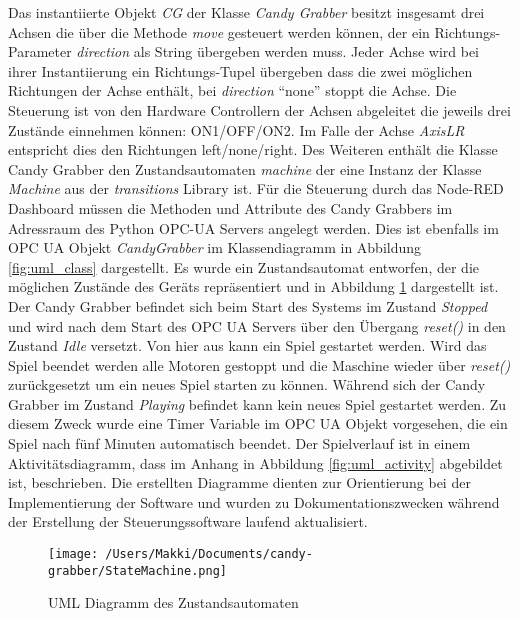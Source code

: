 \documentclass[BMR,Bachelor,ngerman]{twbook}%
\begin{document}
Das instantiierte Objekt \emph{CG} der Klasse \emph{Candy Grabber} besitzt insgesamt drei Achsen die über die Methode \emph{move} gesteuert werden können, der ein Richtungs-Parameter \emph{direction} als String übergeben werden muss. Jeder Achse wird bei ihrer Instantiierung ein Richtungs-Tupel übergeben dass die zwei möglichen Richtungen der Achse enthält, bei \emph{direction} ``none'' stoppt die Achse. Die Steuerung ist von den Hardware Controllern der Achsen abgeleitet die jeweils drei Zustände einnehmen können: ON1/OFF/ON2. Im Falle der Achse \emph{AxisLR} entspricht dies den Richtungen left/none/right. Des Weiteren enthält die Klasse Candy Grabber den Zustandsautomaten \emph{machine} der eine Instanz der Klasse \emph{Machine} aus der \emph{transitions} Library \cite{transitions} ist. Für die Steuerung durch das Node-RED Dashboard müssen die Methoden und Attribute des Candy Grabbers im Adressraum des Python OPC-UA Servers angelegt werden. Dies ist ebenfalls im \ac{OPC UA} Objekt \emph{CandyGrabber} im Klassendiagramm in Abbildung \ref{fig:uml_class} dargestellt. Es wurde ein Zustandsautomat entworfen, der die möglichen Zustände des Geräts repräsentiert und in Abbildung \ref{fig:uml_state} dargestellt ist. Der Candy Grabber befindet sich beim Start des Systems im Zustand \emph{Stopped} und wird nach dem Start des \ac{OPC UA} Servers über den Übergang \emph{reset()} in den Zustand \emph{Idle} versetzt. Von hier aus kann ein Spiel gestartet werden. Wird das Spiel beendet werden alle Motoren gestoppt und die Maschine wieder über \emph{reset()} zurückgesetzt um ein neues Spiel starten zu können. Während sich der Candy Grabber im Zustand \emph{Playing} befindet kann kein neues Spiel gestartet werden. Zu diesem Zweck wurde eine Timer Variable im \ac{OPC UA} Objekt vorgesehen, die ein Spiel nach fünf Minuten automatisch beendet. Der Spielverlauf ist in einem Aktivitätsdiagramm, dass im Anhang in Abbildung \ref{fig:uml_activity} abgebildet ist, beschrieben. Die erstellten Diagramme dienten zur Orientierung bei der Implementierung der Software und wurden zu Dokumentationszwecken während der Erstellung der Steuerungssoftware laufend aktualisiert.
%
\begin{figure}[!htbp]
\centering
\texttt{[image: /Users/Makki/Documents/candy-grabber/StateMachine.png]}
\caption{\ac{UML} Diagramm des Zustandsautomaten}\label{fig:uml_state}
\end{figure}
%
\end{document}
